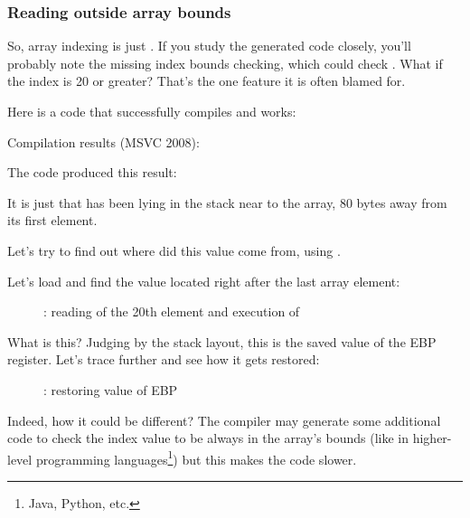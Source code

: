 \subsubsection{Reading outside array bounds}

So, array indexing is just .
If you study the generated code closely, you'll probably note the missing index bounds checking,
which could check .
What if the index is 20 or greater?
That's the one \CCpp feature it is often blamed for.

Here is a code that successfully compiles and works:



Compilation results (MSVC 2008):



The code produced this result:



It is just  that has been lying in the stack near to the array, 80 bytes away from its first element.

\clearpage
\myindex{\olly}
Let's try to find out where did this value come from, using \olly.

Let's load and find the value located right after the last array element:

\begin{figure}[H]
\centering
{}
\caption{\olly: reading of the 20th element and execution of \printf}
\label{fig:array_BO_olly_r1}
\end{figure}

What is this? 
Judging by the stack layout,
this is the saved value of the EBP register.
\clearpage
Let's trace further and see how it gets restored:

\begin{figure}[H]
\centering
{}
\caption{\olly: restoring value of EBP}
\label{fig:array_BO_olly_r2}
\end{figure}

Indeed, how it could be different?
The compiler may generate some additional code to check the index value to be always
in the array's bounds (like in higher-level programming languages\footnote{Java, Python, etc.})
but this makes the code slower.

